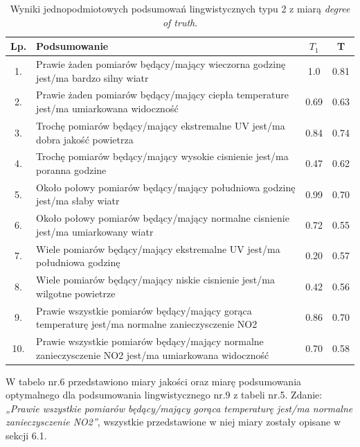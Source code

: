 \documentclass{article}
\begin{document}
\begin{table}[H]
\begin{center}
\normalsize %
\begin{tabular}{|c|p{8cm}|c|c|} %
\hline
\textbf{Lp.} & \textbf{Podsumowanie} & \textbf{\(T_1\)} & \textbf{T} \\ \hline
1. & Prawie żaden pomiarów będący/mający wieczorna godzinę jest/ma bardzo silny wiatr & 1.0 & 0.81\\\hline
2. & Prawie żaden pomiarów będący/mający ciepła temperature jest/ma umiarkowana widoczność & 0.69 & 0.63 \\ \hline
3. & Trochę pomiarów będący/mający ekstremalne UV jest/ma dobra jakość powietrza & 0.84 & 0.74 \\ \hline
4. & Trochę pomiarów będący/mający wysokie cisnienie jest/ma poranna godzine & 0.47 & 0.62 \\ \hline
5. & Około połowy pomiarów będący/mający południowa godzinę jest/ma słaby wiatr & 0.99 & 0.70 \\ \hline
6. & Około połowy pomiarów będący/mający normalne cisnienie jest/ma umiarkowany wiatr & 0.72 & 0.55 \\\hline
7. & Wiele pomiarów będący/mający ekstremalne UV jest/ma południowa godzinę & 0.20 & 0.57 \\ \hline
8. & Wiele pomiarów będący/mający niskie cisnienie jest/ma wilgotne powietrze & 0.42 & 0.56 \\ \hline
9. & Prawie wszystkie pomiarów będący/mający gorąca temperaturę jest/ma normalne zanieczysczenie NO2 & 0.86 & 0.70 \\ \hline
10. & Prawie wszystkie pomiarów będący/mający normalne zanieczysczenie NO2 jest/ma umiarkowana widoczność & 0.70 & 0.58 \\ \hline

\end{tabular}
\caption{Wyniki jednopodmiotowych podsumowań lingwistycznych typu 2 z miarą \textit{degree of truth}.}
\end{center}
\end{table}

W tabelo nr.6 przedstawiono miary jakości oraz miarę podsumowania optymalnego dla podsumowania lingwistycznego nr.9 z tabeli nr.5. Zdanie: \textit{„Prawie wszystkie pomiarów będący/mający gorąca temperaturę jest/ma normalne zanieczysczenie NO2”}, wszystkie przedstawione w niej miary zostały opisane w sekcji 6.1. 
\end{document}
